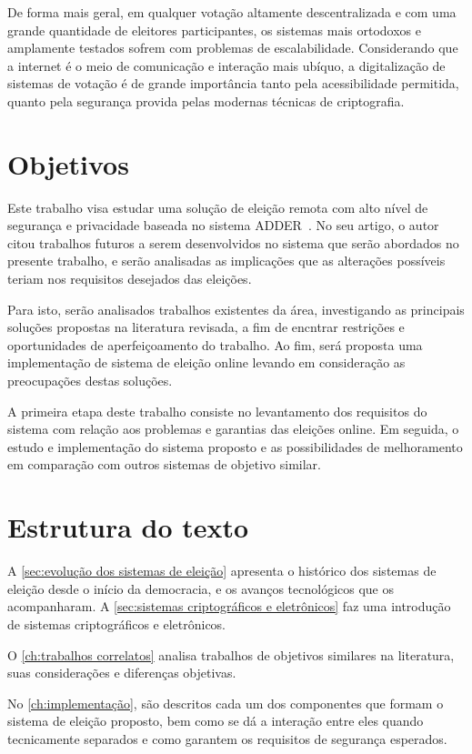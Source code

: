 De forma mais geral, em qualquer votação altamente descentralizada e com uma
grande quantidade de eleitores participantes, os sistemas mais ortodoxos e
amplamente testados sofrem com problemas de escalabilidade. Considerando que a
internet é o meio de comunicação e interação mais ubíquo, a digitalização de
sistemas de votação é de grande importância tanto pela acessibilidade
permitida, quanto pela segurança provida pelas modernas técnicas de
criptografia.

\section{Objetivos}

Este trabalho visa estudar uma solução de eleição remota com alto nível de
segurança e privacidade baseada no sistema ADDER~\cite{kiayias2006internet}. No
seu artigo, o autor citou trabalhos futuros a serem desenvolvidos no sistema
que serão abordados no presente trabalho, e serão analisadas as implicações que
as alterações possíveis teriam nos requisitos desejados das eleições.

Para isto, serão analisados trabalhos existentes da área, investigando as
principais soluções propostas na literatura revisada, a fim de encntrar
restrições e oportunidades de aperfeiçoamento do trabalho. Ao fim, será
proposta uma implementação de sistema de eleição online levando em consideração
as preocupações destas soluções.

A primeira etapa deste trabalho consiste no levantamento dos requisitos do
sistema com relação aos problemas e garantias das eleições online. Em seguida,
o estudo e implementação do sistema proposto e as possibilidades de
melhoramento em comparação com outros sistemas de objetivo similar.

\section{Estrutura do texto}

A \autoref{sec:evolução dos sistemas de eleição} apresenta o histórico dos
sistemas de eleição desde o início da democracia, e os avanços tecnológicos que
os acompanharam. A \autoref{sec:sistemas criptográficos e eletrônicos} faz uma
introdução de sistemas criptográficos e eletrônicos.

O \autoref{ch:trabalhos correlatos} analisa trabalhos de objetivos similares na
literatura, suas considerações e diferenças objetivas.

No \autoref{ch:implementação}, são descritos cada um dos componentes que formam
o sistema de eleição proposto, bem como se dá a interação entre eles quando
tecnicamente separados e como garantem os requisitos de segurança esperados.
